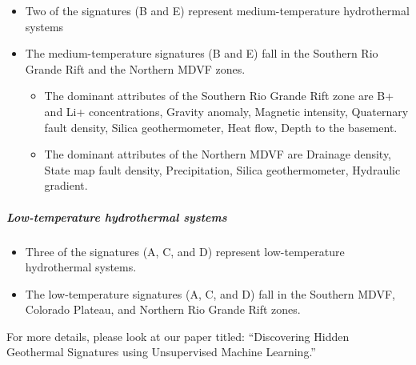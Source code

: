 \documentclass[11pt]{article}
\providecommand{\tightlist}{%
      \setlength{\itemsep}{0pt}\setlength{\parskip}{0pt}}
\begin{document}
\begin{itemize}
\tightlist
\item
  Two of the signatures (B and E) represent medium-temperature
  hydrothermal systems
\item
  The medium-temperature signatures (B and E) fall in the Southern Rio
  Grande Rift and the Northern MDVF zones.

  \begin{itemize}
  \tightlist
  \item
    The dominant attributes of the Southern Rio Grande Rift zone are B+
    and Li+ concentrations, Gravity anomaly, Magnetic intensity,
    Quaternary fault density, Silica geothermometer, Heat flow, Depth to
    the basement.
  \item
    The dominant attributes of the Northern MDVF are Drainage density,
    State map fault density, Precipitation, Silica geothermometer,
    Hydraulic gradient.
  \end{itemize}
\end{itemize}

\hypertarget{low-temperature-hydrothermal-systems}{%
\subparagraph{Low-temperature hydrothermal
systems}\label{low-temperature-hydrothermal-systems}}

\begin{itemize}
\tightlist
\item
  Three of the signatures (A, C, and D) represent low-temperature
  hydrothermal systems.
\item
  The low-temperature signatures (A, C, and D) fall in the Southern
  MDVF, Colorado Plateau, and Northern Rio Grande Rift zones.
\end{itemize}

For more details, please look at our paper titled: ``Discovering Hidden
Geothermal Signatures using Unsupervised Machine Learning.''


    
    
    
\end{document}
